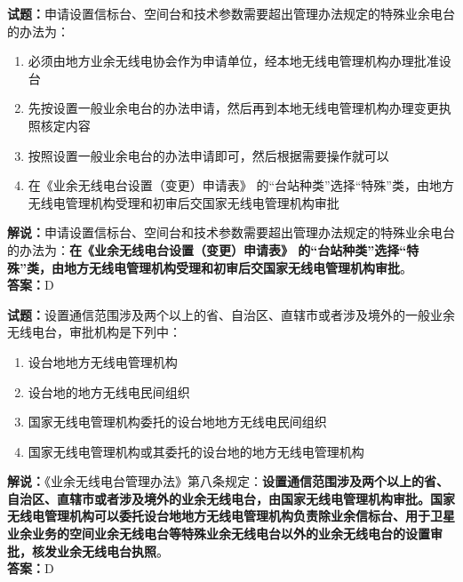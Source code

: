 \documentclass{ctexbook}
\begin{document}
\noindent\textbf{试题：}申请设置信标台、空间台和技术参数需要超出管理办法规定的特殊业余电台的办法为：
\begin{enumerate}[leftmargin=3em]
  \item 必须由地方业余无线电协会作为申请单位，经本地无线电管理机构办理批准设台
  \item 先按设置一般业余电台的办法申请，然后再到本地无线电管理机构办理变更执照核定内容
  \item 按照设置一般业余电台的办法申请即可，然后根据需要操作就可以
  \item 在《业余无线电台设置（变更）申请表》 的“台站种类”选择“特殊”类，由地方无线电管理机构受理和初审后交国家无线电管理机构审批
\end{enumerate}
\noindent\textbf{解说：}申请设置信标台、空间台和技术参数需要超出管理办法规定的特殊业余电台的办法为：\textbf{在《业余无线电台设置（变更）申请表》 的“台站种类”选择“特殊”类，由地方无线电管理机构受理和初审后交国家无线电管理机构审批}。\\\noindent\textbf{答案：}D

\bigskip

\noindent\textbf{试题：}设置通信范围涉及两个以上的省、自治区、直辖市或者涉及境外的一般业余无线电台，审批机构是下列中：
\begin{enumerate}[leftmargin=3em]
  \item 设台地地方无线电管理机构
  \item 设台地的地方无线电民间组织
  \item 国家无线电管理机构委托的设台地地方无线电民间组织
  \item 国家无线电管理机构或其委托的设台地的地方无线电管理机构
\end{enumerate}
\noindent\textbf{解说：}《业余无线电台管理办法》第八条规定：\textbf{设置通信范围涉及两个以上的省、自治区、直辖市或者涉及境外的业余无线电台，由国家无线电管理机构审批。国家无线电管理机构可以委托设台地地方无线电管理机构负责除业余信标台、用于卫星业余业务的空间业余无线电台等特殊业余无线电台以外的业余无线电台的设置审批，核发业余无线电台执照}。\\\noindent\textbf{答案：}D

\bigskip
\end{document}
